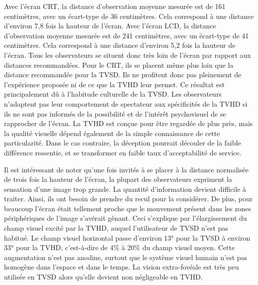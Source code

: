 Avec l'écran CRT, la distance d'observation moyenne mesurée est de 161 centimètres, avec un écart-type de 36 centimètres. Cela correspond à une distance d'environ 7,8 fois la hauteur de l'écran. Avec l'écran LCD, la distance d'observation moyenne mesurée est de 241 centimètres, avec un écart-type de 41 centimètres. Cela correspond à une distance d'environ 5,2 fois la hauteur de l'écran. Tous les observateurs se situent donc très loin de l'écran par rapport aux distances recommandées. Pour le CRT, ils se placent même plus loin que la distance recommandée pour la TVSD. Ils ne profitent donc pas pleinement de l'expérience proposée ni de ce que la TVHD leur permet. Ce résultat est principalement dû à l'habitude culturelle de la TVSD. Les observateurs n'adaptent pas leur comportement de spectateur aux spécificités de la TVHD si ils ne sont pas informés de la possibilité et de l'intérêt psychovisuel de se rapprocher de l'écran. La TVHD est conçue pour être regardée de plus près, mais la qualité visuelle dépend également de la simple connaissance de cette particularité. Dans le cas contraire, la déception pourrait découler de la faible différence ressentie, et se transformer en faible taux d'acceptabilité de service.


Il est intéressant de noter qu'une fois invités à se placer à la distance normalisée de trois fois la hauteur de l'écran, la plupart des observateurs expriment la sensation d'une image trop grande. La quantité d'information devient difficile à traiter. Ainsi, ils ont besoin de prendre du recul pour la considérer. De plus, pour beaucoup l'écran était tellement proche que le mouvement présent dans les zones périphériques de l'image s'avérait gênant. Ceci s'explique par l'élargissement du champ visuel excité par la TVHD, auquel l'utilisateur de TVSD n'est pas habitué. Le champ visuel horizontal passe d'environ 13° pour la TVSD à environ 33° pour la TVHD, c'est-à-dire de 4\% à 20\% du champ visuel moyen. Cette augmentation n'est pas anodine, surtout que le système visuel humain n'est pas homogène dans l'espace et dans le temps. La vision extra-fovéale est très peu utilisée en TVSD alors qu'elle devient non négligeable en TVHD. %


